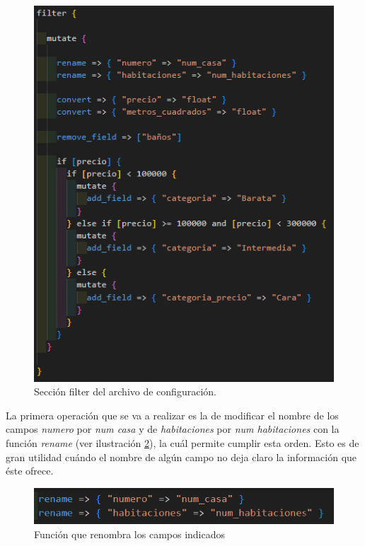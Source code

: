 \begin{figure}
    \centering
    \includegraphics[width=1\linewidth]{img/filter.png}
    \caption{Sección filter del archivo de configuración.}
    \label{fig:filter}
\end{figure}

La primera operación que se va a realizar es la de modificar el nombre de los campos \textit{numero} por \textit{num casa} y de \textit{habitaciones} por \textit{num habitaciones} con la función \textit{rename}  (ver ilustración  \ref{fig:rename}), la cuál permite cumplir esta orden. Esto es de gran utilidad cuándo el nombre de algún campo no deja claro la información que éste ofrece.

\begin{figure}
    \centering
    \includegraphics[width=1\linewidth]{img/rename.png}
    \caption{Función que renombra los campos indicados}
    \label{fig:rename}
\end{figure}

